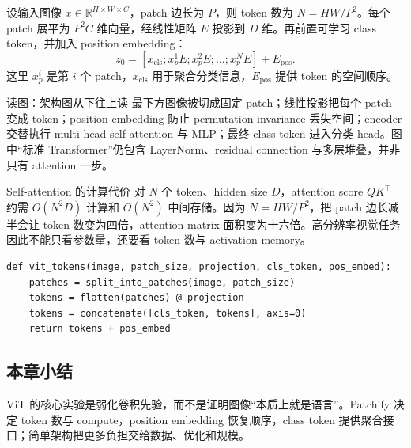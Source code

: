 设输入图像 $x\in\mathbb{R}^{H\times W\times C}$，patch 边长为 $P$，则 token 数为 $N=HW/P^2$。每个 patch 展平为 $P^2C$ 维向量，经线性矩阵 $E$ 投影到 $D$ 维。再前置可学习 class token，并加入 position embedding：
\[
z_0=[x_{\mathrm{cls}};x_p^1E;x_p^2E;\ldots;x_p^NE]+E_{\mathrm{pos}}.
\]
这里 $x_p^i$ 是第 $i$ 个 patch，$x_{\mathrm{cls}}$ 用于聚合分类信息，$E_{\mathrm{pos}}$ 提供 token 的空间顺序。


\begin{knowledgebox}{读图：架构图从下往上读}
最下方图像被切成固定 patch；线性投影把每个 patch 变成 token；position embedding 防止 permutation invariance 丢失空间；encoder 交替执行 multi-head self-attention 与 MLP；最终 class token 进入分类 head。图中“标准 Transformer”仍包含 LayerNorm、residual connection 与多层堆叠，并非只有 attention 一步。
\end{knowledgebox}

\begin{importantbox}{Self-attention 的计算代价}
对 $N$ 个 token、hidden size $D$，attention score $QK^{\top}$ 约需 $O(N^2D)$ 计算和 $O(N^2)$ 中间存储。因为 $N=HW/P^2$，把 patch 边长减半会让 token 数变为四倍，attention matrix 面积变为十六倍。高分辨率视觉任务因此不能只看参数量，还要看 token 数与 activation memory。
\end{importantbox}

\begin{lstlisting}[caption={Patchify and prepend a class token}]
def vit_tokens(image, patch_size, projection, cls_token, pos_embed):
    patches = split_into_patches(image, patch_size)
    tokens = flatten(patches) @ projection
    tokens = concatenate([cls_token, tokens], axis=0)
    return tokens + pos_embed
\end{lstlisting}

\subsection{本章小结}

ViT 的核心实验是弱化卷积先验，而不是证明图像“本质上就是语言”。Patchify 决定 token 数与 compute，position embedding 恢复顺序，class token 提供聚合接口；简单架构把更多负担交给数据、优化和规模。

